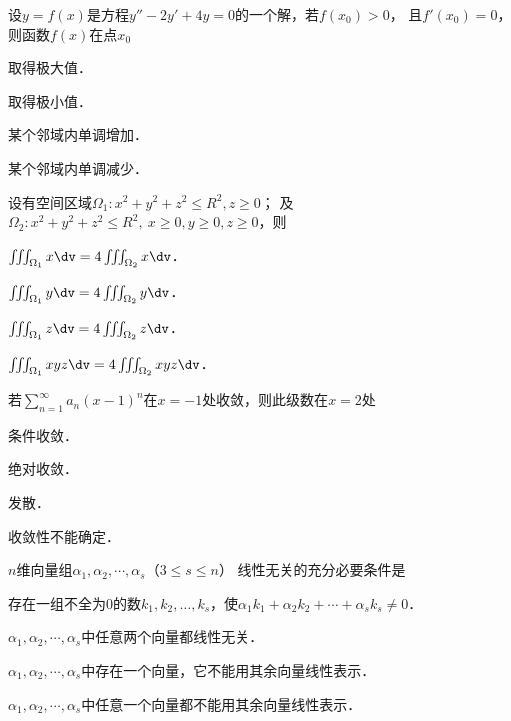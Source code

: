 \documentclass[plain,noanswer,medmath]{../../template/jnuexam}
\begin{document}
\begin{problem}
设$y=f(x)$是方程$y''-2y'+4y=0$的一个解，若$f(x_0)>0$，
且$f'(x_0)=0$，则函数$f(x)$在点$x_0$ \pickout{}
\begin{abcd}
\item 取得极大值．
\item 取得极小值．
\item 某个邻域内单调增加．
\item 某个邻域内单调减少．
\end{abcd}
\end{problem}


\begin{problem}
设有空间区域$\Omega_1:x^2+y^2+z^2\le R^2,z\ge 0$；\newline
及$\Omega_2:x^2+y^2+z^2\le R^2,~x\ge 0,y\ge 0,z\ge 0$，则 \pickout{}
\begin{abcd}
\item $\iiint_{\Omega_1}x\dv=4\iiint_{\Omega_2}x\dv$．
\item $\iiint_{\Omega_1}y\dv=4\iiint_{\Omega_2}y\dv$．
\item $\iiint_{\Omega_1}z\dv=4\iiint_{\Omega_2}z\dv$．
\item $\iiint_{\Omega_1}xyz\dv=4\iiint_{\Omega_2}xyz\dv$．
\end{abcd}
\end{problem}


\begin{problem}
若$\sum_{n=1}^{\infty}a_n(x-1)^n$在$x=-1$处收敛，则此级数在$x=2$处 \pickout{}
\begin{abcd}
\item 条件收敛．
\item 绝对收敛．
\item 发散．
\item 收敛性不能确定．
\end{abcd}
\end{problem}


\begin{problem}
$n$维向量组$\alpha_1,\alpha_2,\cdots,\alpha_s$（$3\le s\le n$）%
线性无关的充分必要条件是 \pickout{}
\begin{abcd}
\item 存在一组不全为$0$的数$k_1,k_2,\ldots,k_s$，使$\alpha_1k_1+\alpha_2k_2+\cdots+\alpha_sk_s\ne 0$．
\item $\alpha_1,\alpha_2,\cdots,\alpha_s$中任意两个向量都线性无关．
\item $\alpha_1,\alpha_2,\cdots,\alpha_s$中存在一个向量，它不能用其余向量线性表示．
\item $\alpha_1,\alpha_2,\cdots,\alpha_s$中任意一个向量都不能用其余向量线性表示．
\end{abcd}
\end{problem}
\end{document}
